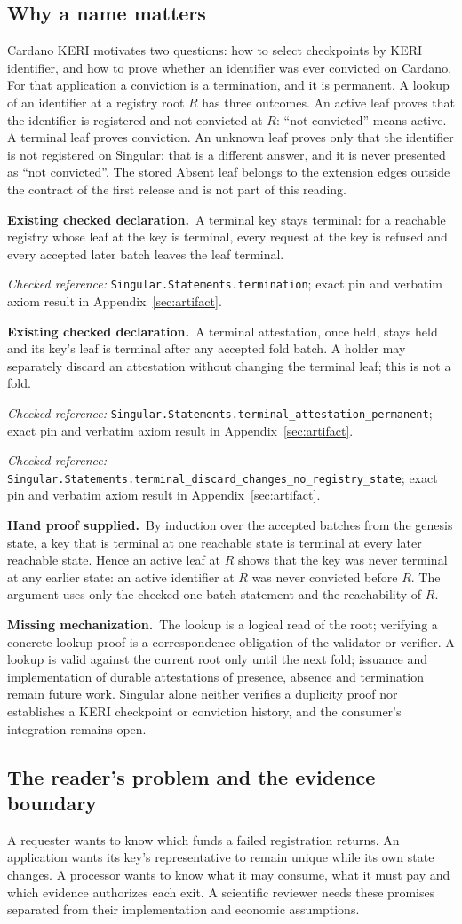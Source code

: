 \documentclass[runningheads]{llncs}
\newcommand{\checked}{\par\noindent\textcolor{green!35!black}{\textbf{Existing checked declaration.}}\ }
\newcommand{\hand}{\par\noindent\textcolor{blue!65!black}{\textbf{Hand proof supplied.}}\ }
\newcommand{\missing}{\par\noindent\textcolor{red!65!black}{\textbf{Missing mechanization.}}\ }
\newcommand{\decl}[1]{\textnormal{\small\nolinkurl{#1}}}
\newcommand{\evidence}[1]{\par\noindent\textit{Checked reference:} \decl{Singular.Statements.#1}; exact pin and verbatim axiom result in Appendix~\ref{sec:artifact}.\par}
\begin{document}
\subsection{Why a name matters}
Cardano KERI motivates two questions: how to select checkpoints by KERI
identifier, and how to prove whether an identifier was ever convicted on
Cardano. For that application a conviction is a termination, and it is
permanent. A lookup of an identifier at a registry root $R$ has three
outcomes. An active leaf proves that the identifier is registered and not
convicted at $R$: ``not convicted'' means active. A terminal leaf proves
conviction. An unknown leaf proves only that the identifier is not
registered on Singular; that is a different answer, and it is never
presented as ``not convicted''. The stored Absent leaf belongs to the
extension edges outside the contract of the first release and is not part of
this reading.
\checked A terminal key stays terminal: for a reachable registry whose leaf
at the key is terminal, every request at the key is refused and every accepted
later batch leaves the leaf terminal.
\evidence{termination}
\checked A terminal attestation, once held, stays held and its key's leaf is
terminal after any accepted fold batch. A holder may separately discard an
attestation without changing the terminal leaf; this is not a fold.
\evidence{terminal_attestation_permanent}
\evidence{terminal_discard_changes_no_registry_state}
\hand By induction over the accepted batches from the genesis state, a key
that is terminal at one reachable state is terminal at every later reachable
state. Hence an active leaf at $R$ shows that the key was never terminal at
any earlier state: an active identifier at $R$ was never convicted before
$R$. The argument uses only the checked one-batch statement and the
reachability of $R$.
\missing The lookup is a logical read of the root; verifying a concrete
lookup proof is a correspondence obligation of the validator or verifier. A
lookup is valid against the current root only until the next fold;
issuance and implementation of durable attestations of presence, absence
and termination remain future work. Singular alone neither verifies a duplicity
proof nor
establishes a KERI checkpoint or conviction history, and the consumer's
integration remains open.

\subsection{The reader's problem and the evidence boundary}
A requester wants to know which funds a failed registration returns. An
application wants its key's representative to remain unique while its own state
changes. A processor wants to know what it may consume, what it must pay and
which evidence authorizes each exit. A scientific reviewer needs these promises
separated from their implementation and economic assumptions.
\end{document}
